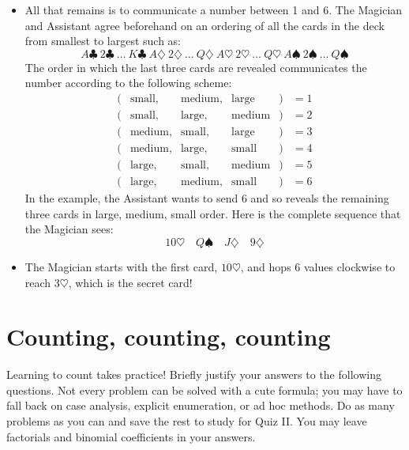\documentclass[12pt]{article}
\newcommand{\spa}{\spadesuit}
\newcommand{\hea}{\heartsuit}
\newcommand{\dia}{\diamondsuit}
\newcommand{\clu}{\clubsuit}
\begin{document}
{\begin{itemize}
\item All that remains is to communicate a number between 1 and 6.
The Magician and Assistant agree beforehand on an ordering of all the
cards in the deck from smallest to largest such as:
%
\[
A \clu\ 2 \clu\ \ldots\ K \clu\ 
A \dia\ 2 \dia\ \ldots\ Q \dia\ 
A \hea\ 2 \hea\ \ldots\ Q \hea\ 
A \spa\ 2 \spa\ \ldots\ Q \spa
\]
%
The order in which the last three cards are revealed communicates the
number according to the following scheme:
%
\[
\begin{array}{rcccll}
(&\text{small},&\text{medium},&\text{large}&) & = 1 \\
(&\text{small},&\text{large},&\text{medium}&) & = 2 \\
(&\text{medium},&\text{small},&\text{large}&) & = 3 \\
(&\text{medium},&\text{large},&\text{small}&) & = 4 \\
(&\text{large},&\text{small},&\text{medium}&) & = 5 \\
(&\text{large},&\text{medium},&\text{small}&) & = 6
\end{array}
\]
%
In the example, the Assistant wants to send 6 and so reveals the
remaining three cards in large, medium, small order.  Here is the
complete sequence that the Magician sees:
%
\[
10 \hea \quad Q \spa \quad J \dia \quad 9 \dia
\]

\item The Magician starts with the first card, $10 \hea$, and hops 6
values clockwise to reach $3 \hea$, which is the secret card!

\end{itemize}
}
\fi



\section{Counting, counting, counting}
Learning to count takes practice!  Briefly justify your answers to the
following questions.  Not every problem can be solved with a cute
formula; you may have to fall back on case analysis, explicit
enumeration, or ad hoc methods.  Do as many problems as you can and
save the rest to study for Quiz II.  You may leave factorials and
binomial coefficients in your answers.
\end{document}
